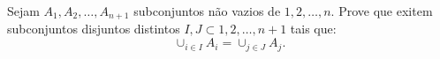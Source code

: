 Sejam $A_1, A_2, \dots, A_{n+1}$ subconjuntos não vazios de ${1, 2, \dots, n}$.
Prove que exitem subconjuntos disjuntos distintos $I, J \subset {1, 2, \dots, n+1}$ tais que:
$$\cup_{i \in I} A_i = \cup_{j \in J} A_j.$$
